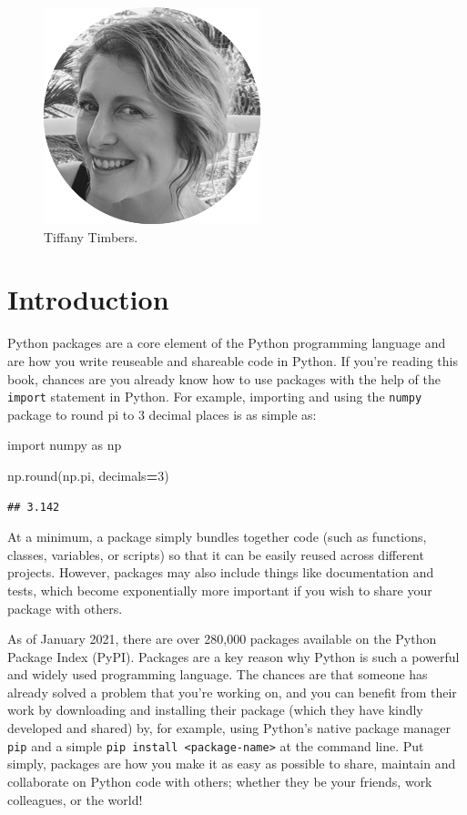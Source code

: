 \documentclass[
]{krantz}
\makeatletter
\newenvironment{Shaded}{\begin{snugshade}}{\end{snugshade}}
\newcommand{\BuiltInTok}[1]{#1}
\newcommand{\DecValTok}[1]{\textcolor[rgb]{0.06,0.06,0.06}{#1}}
\newcommand{\ImportTok}[1]{#1}
\newcommand{\NormalTok}[1]{#1}
\newcommand{\OperatorTok}[1]{\textcolor[rgb]{0.43,0.43,0.43}{\textbf{#1}}}
\newenvironment{kframe}{%
\medskip{}
\setlength{\fboxsep}{.8em}
 \def\at@end@of@kframe{}%
 \ifinner\ifhmode%
  \def\at@end@of@kframe{\end{minipage}}%
  \begin{minipage}{\columnwidth}%
 \fi\fi%
 \def\FrameCommand##1{\hskip\@totalleftmargin \hskip-\fboxsep
 \colorbox{shadecolor}{##1}\hskip-\fboxsep
     \hskip-\linewidth \hskip-\@totalleftmargin \hskip\columnwidth}%
 \MakeFramed {\advance\hsize-\width
   \@totalleftmargin\z@ \linewidth\hsize
   \@setminipage}}%
 {\par\unskip\endMakeFramed%
 \at@end@of@kframe}
\renewenvironment{Shaded}{\begin{kframe}}{\end{kframe}}
\makeatother
\begin{document}
\begin{figure}

{\centering \includegraphics[width=0.3\linewidth]{../images/tiffany-timbers} 

}

\caption{Tiffany Timbers.}\label{fig:00-tiffany-timbers}
\end{figure}

\mainmatter

\hypertarget{introduction}{%
\chapter{Introduction}\label{introduction}}

Python packages are a core element of the Python programming language and are how you write reuseable and shareable code in Python. If you're reading this book, chances are you already know how to use packages with the help of the \texttt{import} statement in Python. For example, importing and using the \texttt{numpy} package to round pi to 3 decimal places is as simple as:

\begin{Shaded}
\begin{Highlighting}[]
\ImportTok{import}\NormalTok{ numpy }\ImportTok{as}\NormalTok{ np}

\NormalTok{np.}\BuiltInTok{round}\NormalTok{(np.pi, decimals}\OperatorTok{=}\DecValTok{3}\NormalTok{)}
\end{Highlighting}
\end{Shaded}

\begin{verbatim}
## 3.142
\end{verbatim}

At a minimum, a package simply bundles together code (such as functions, classes, variables, or scripts) so that it can be easily reused across different projects. However, packages may also include things like documentation and tests, which become exponentially more important if you wish to share your package with others.

As of January 2021, there are over 280,000 packages available on the Python Package Index (PyPI). Packages are a key reason why Python is such a powerful and widely used programming language. The chances are that someone has already solved a problem that you're working on, and you can benefit from their work by downloading and installing their package (which they have kindly developed and shared) by, for example, using Python's native package manager \texttt{pip} and a simple \texttt{pip\ install\ \textless{}package-name\textgreater{}} at the command line. Put simply, packages are how you make it as easy as possible to share, maintain and collaborate on Python code with others; whether they be your friends, work colleagues, or the world!
\end{document}

